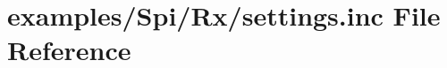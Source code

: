 \hypertarget{examples_2Spi_2Rx_2settings_8inc}{}\section{examples/\+Spi/\+Rx/settings.inc File Reference}
\label{examples_2Spi_2Rx_2settings_8inc}
